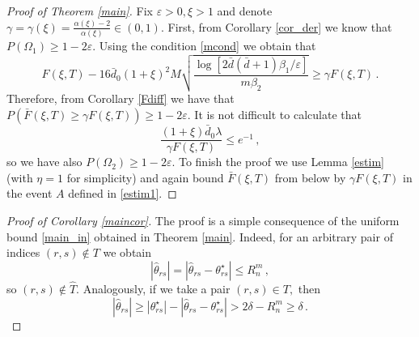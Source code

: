 \documentclass[twoside,11pt]{article}
\def\th{\theta}
\def\ths{\th^\star}
\def\hth{\hat{\theta}}
\def\rs{_{rs}}
\def\bbd{\bar{d}}
\def\bd0{\bar{d} _0}
\def\ef{F(\xi,T)}
\def\bef{\bar{F}(\xi,T)}
\begin{document}
\begin{proof}[Proof of Theorem \ref{main}]
Fix $\varepsilon >0, \xi >1$ and denote $\gamma=\gamma(\xi) = \frac{\alpha(\xi)-2}{\alpha(\xi)} \in (0,1).$ 
First, from Corollary \ref{cor_der} we know that $P (\Omega_1 ) \geq 1-2\varepsilon.$
Using the condition \eqref{mcond} we obtain that 
\[
\ef 
-  16 \bd0 (1+\xi)^2 M  \sqrt{  \frac{\log\left[2 \bbd (\bbd+1)\beta_1 /\varepsilon\right]}{m\beta_2}} \geq \gamma \ef\,.
\]
Therefore, from Corollary \ref{Fdiff} we have that $P (\bef \geq \gamma \ef) \geq 1-2 \varepsilon.$ It is not difficult to calculate that 
\[
\frac{(1+\xi) \bd0 \lambda}{ \gamma \ef} \leq e^{-1}\,,
\]
so we have also $P (\Omega_2 ) \geq 1-2\varepsilon.$
To finish the proof we use Lemma \ref{estim} (with $\eta=1$ for simplicity) and again bound $\bef$ from below by $\gamma \ef $ in the event $A$ defined in \eqref{estim1}.

\end{proof}



\begin{proof}[Proof of Corollary \ref{maincor}]
The proof is a simple consequence of the uniform bound \eqref{main_in} obtained in Theorem \ref{main}. Indeed, for an  arbitrary pair of indices $(r,s) \notin T$ we obtain 
\[
|\hth \rs | =|\hth \rs  - \ths \rs| \leq R_n^m\,,
\] 
so $(r,s) \notin \hat{T}.$
Analogously, if we take a pair  $(r,s) \in T,$ then 
\[
|\hth \rs | \geq  |\ths \rs| -|\hth \rs  - \ths \rs| > 2 \delta  - R_n^m \geq \delta\,. 
\]
\end{proof}







\end{document}
